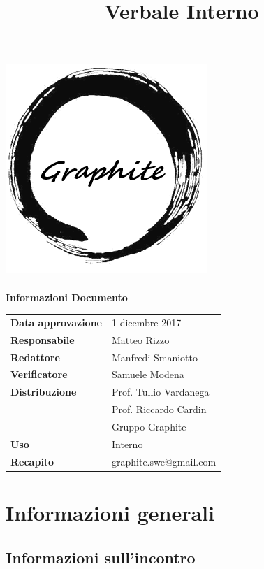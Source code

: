 \documentclass[openany,12pt,a4paper]{article}
\title{Verbale Interno}
\author{}
\begin{document}
	\makeatletter
	\begin{titlepage}
		\setlength{\headsep}{0pt}  
		\begin{center}
			\includegraphics[width=0.5\linewidth]{Logo.png}\\[1em]
			{\huge \bfseries  \@title }\\[10ex]
			\textbf{\Large Informazioni Documento} \\[2em]
			\bgroup
			\def\arraystretch{1.5}
			\begin{tabular}{l|l}
				\textbf{Data approvazione} & 1 dicembre 2017 \\
				\textbf{Responsabile} & Matteo Rizzo \\
				\textbf{Redattore} & Manfredi Smaniotto \\
				\textbf{Verificatore} & Samuele Modena \\
				\textbf{Distribuzione} & Prof. Tullio Vardanega \\
				 & Prof. Riccardo Cardin \\
				 & Gruppo Graphite \\
				\textbf{Uso} & Interno \\
				\textbf{Recapito} & graphite.swe@gmail.com \\
			\end{tabular}
		\egroup
		\end{center}
	\end{titlepage}
	\makeatother

	\thispagestyle{empty}
	\newpage
	
	\tableofcontents
	\newpage
	
	\section{Informazioni generali}
	
	\subsection{Informazioni sull'incontro}
	
\end{document}
